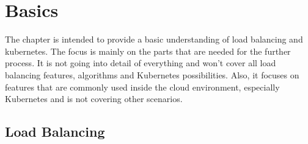 \chapter{Basics}

The chapter is intended to provide a basic understanding of load balancing and kubernetes.
The focus is mainly on the parts that are needed for the further process.
It is not going into detail of everything and won't cover all load balancing features, algorithms and Kubernetes possibilities.
Also, it focuses on features that are commonly used inside the cloud environment, especially Kubernetes and is not covering other scenarios.

\section{Load Balancing}

